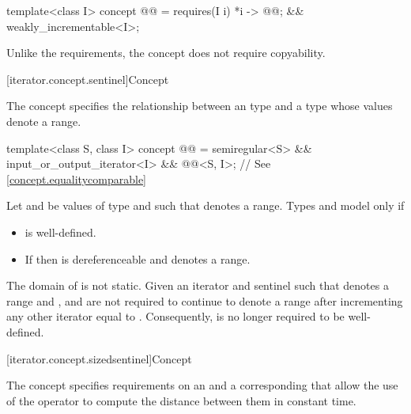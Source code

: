 \begin{codeblock}
template<class I>
  concept @@ =
    requires(I i) {
      { *i } -> @@;
    } &&
    weakly_incrementable<I>;
\end{codeblock}

\pnum
\begin{note}
Unlike the  requirements,
the  concept does not require copyability.
\end{note}

[iterator.concept.sentinel]{Concept }

\pnum
The  concept specifies the relationship
between an  type and a  type
whose values denote a range.

\begin{itemdecl}
template<class S, class I>
  concept @@ =
    semiregular<S> &&
    input_or_output_iterator<I> &&
    @@<S, I>; // See \ref{concept.equalitycomparable}
\end{itemdecl}

\begin{itemdescr}
\pnum
Let  and  be values of type  and
 such that  denotes a range. Types
 and  model  only if
\begin{itemize}
\item {} is well-defined.

\item If  then  is dereferenceable and
       denotes a range.
\end{itemize}
\end{itemdescr}

\pnum
The domain of \tcode{==} is not static.
Given an iterator  and sentinel  such that 
denotes a range and ,  and  are not required to
continue to denote a range after incrementing any other iterator equal
to . Consequently,  is no longer required to be
well-defined.

[iterator.concept.sizedsentinel]{Concept }

\pnum
The  concept specifies
requirements on an  and
a corresponding 
that allow the use of the \tcode{-} operator to compute the distance
between them in constant time.

